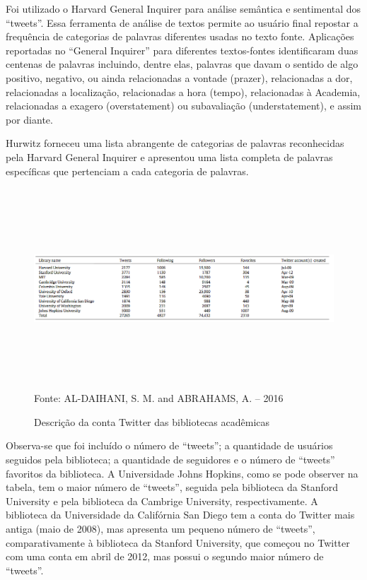Foi utilizado o Harvard General Inquirer \cite{stone1968general} para análise semântica e sentimental dos ``tweets''. Essa ferramenta de análise de textos permite ao usuário final repostar a frequência de categorias de palavras diferentes usadas no texto fonte. Aplicações reportadas no ``General Inquirer'' para diferentes textos-fontes identificaram duas centenas de palavras incluindo, dentre elas, palavras que davam o sentido de algo positivo, negativo, ou ainda relacionadas a vontade (prazer), relacionadas a dor, relacionadas a localização, relacionadas a hora (tempo), relacionadas à Academia, relacionadas a exagero (overstatement) ou subavaliação (understatement), e assim por diante. 

Hurwitz forneceu uma lista abrangente de categorias de palavras reconhecidas pela Harvard General Inquirer e apresentou uma lista completa de palavras específicas que pertenciam a cada categoria de palavras. 


\begin{figure}[ht]
	\centering
	\caption{Descrição da conta Twitter das bibliotecas acadêmicas}
	\includegraphics[width=175mm, height=75mm]{Figuras/Twitter/contaTwitter.png}\\
	\tiny Fonte: AL-DAIHANI, S. M. and ABRAHAMS, A. -- 2016
\end{figure}

Observa-se que foi incluído o número de ``tweets''; a quantidade de usuários seguidos pela biblioteca; a quantidade de seguidores e o número de ``tweets'' favoritos da biblioteca. A Universidade Johns Hopkins, como se pode observer na tabela, tem o maior número de
``tweets'', seguida pela biblioteca da Stanford University e pela biblioteca da Cambrige University, respectivamente. A biblioteca da Universidade da Califórnia San Diego tem a conta do Twitter mais antiga (maio de 2008), mas apresenta um pequeno número de ``tweets'',
comparativamente à biblioteca da Stanford University, que começou no Twitter com uma conta em abril de 2012, mas possui o segundo maior número de ``tweets''. 


